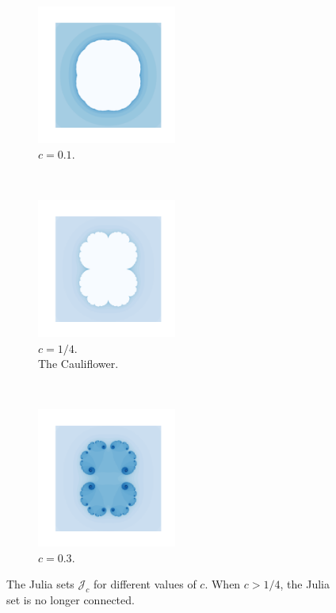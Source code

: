 \begin{figure}[t!] 
    \centering
    ~ 
    \begin{subfigure}[t]{0.3\textwidth}
        \centering
        \includegraphics[height=1.8in]{"figures/julia_01.png"}
        \caption{$c=0.1$.}
    \end{subfigure}	
	~
    \begin{subfigure}[t]{0.3\textwidth}
        \centering
        \includegraphics[height=1.8in]{"figures/julia_025.png"}
        \caption{$c=1/4$. \\ The Cauliflower.}
    \end{subfigure}%
    ~ 
    \begin{subfigure}[t]{0.3\textwidth}
        \centering
        \includegraphics[height=1.8in]{"figures/julia_03.png"}
        \caption{$c=0.3$.}
    \end{subfigure}
    \caption{The Julia sets $\mathcal J_c$ for different values of $c$. When $c>1/4$, the Julia set is no longer connected.}    \label{fig:julia_sets}

\end{figure}